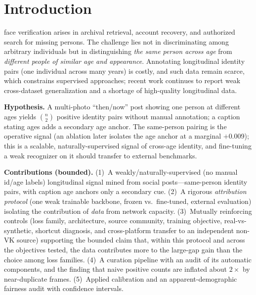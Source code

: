 \documentclass[journal]{IEEEtran}
\begin{document}
\maketitle
\IEEEdisplaynontitleabstractindextext
\IEEEpeerreviewmaketitle

\section{Introduction}\label{sec:intro}
 face verification arises in archival retrieval, account recovery, and authorized search for missing persons. The challenge lies not in discriminating among arbitrary individuals but in distinguishing \emph{the same person across age} from \emph{different people of similar age and appearance}. Annotating longitudinal identity pairs (one individual across many years) is costly, and such data remain scarce, which constrains supervised approaches; recent work continues to report weak cross-dataset generalization and a shortage of high-quality longitudinal data.

\textbf{Hypothesis.} A multi-photo ``then/now'' post showing one person at different ages yields $\binom{n}{2}$ positive identity pairs without manual annotation; a caption stating ages adds a secondary age anchor. The same-person pairing is the operative signal (an ablation later isolates the age anchor at a marginal $+$0.009); this is a scalable, naturally-supervised signal of cross-age identity, and fine-tuning a weak recognizer on it should transfer to external benchmarks.

\textbf{Contributions (bounded).}
(1)~A weakly/naturally-supervised (no manual id/age labels) longitudinal signal mined from social posts---same-person identity pairs, with caption age anchors only a secondary cue.
(2)~A rigorous \emph{attribution protocol} (one weak trainable backbone, frozen vs.\ fine-tuned, external evaluation) isolating the contribution of \emph{data} from network capacity.
(3)~Mutually reinforcing controls (loss family, architecture, source community, training objective, real-vs-synthetic, shortcut diagnosis, and cross-platform transfer to an independent non-VK source) supporting the bounded claim that, within this protocol and across the objectives tested, the data contributes more to the large-gap gain than the choice among loss families.
(4)~A curation pipeline with an audit of its automatic components, and the finding that naive positive counts are inflated about $2\times$ by near-duplicate frames.
(5)~Applied calibration and an apparent-demographic fairness audit with confidence intervals.
\end{document}
